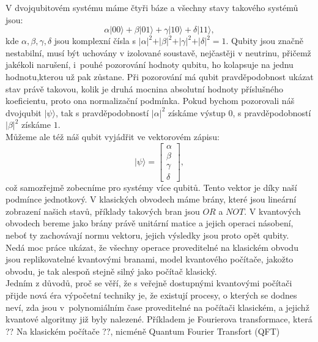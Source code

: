 \documentclass [12pt]{report}
\begin{document}
V dvojqubitovém systému máme čtyři báze a všechny stavy takového systémů jsou:
\begin{equation*}
\alpha \vert 00 \rangle + \beta \vert 01 \rangle + \gamma \vert 10 \rangle + \delta \vert 11 \rangle, 
\end{equation*}
kde $\alpha,\beta,\gamma,\delta$ jsou komplexní čísla s $\vert \alpha \vert ^2 + \vert \beta \vert^2 + \vert \gamma \vert^2 + \vert \delta \vert^2 = 1$. Qubity jsou značně nestabilní, musí být uchovány v izolované soustavě, nejčastěji v neutrinu, přičemž jakékoli narušení, i~pouhé pozorování hodnoty qubitu, ho kolapsuje na jednu hodnotu,kterou už pak zůstane. Při pozorování má qubit pravděpodobnost ukázat stav právě takovou, kolik je druhá mocnina absolutní hodnoty příslušného koeficientu, proto ona normalizační podmínka. Pokud bychom pozorovali náš dvojqubit $\vert \psi \rangle$, tak s pravděpodobností $\vert \alpha \vert ^2$ získáme výstup $0$, s pravděpodobností $\vert \beta \vert ^2$ získáme $1$.\\

Můžeme ale též náš qubit vyjádřit ve vektorovém zápisu:
\begin{equation*}
\vert \psi \rangle = \begin{bmatrix}
\alpha \\
\beta \\
\gamma \\
\delta
\end{bmatrix},
\end{equation*}
což samozřejmě zobecníme pro systémy více qubitů. Tento vektor je díky naší podmínce jednotkový. V klasických obvodech máme brány, které jsou lineární zobrazení našich stavů, příklady takových bran jsou $OR$ a $NOT$. V kvantových obvodech bereme jako brány právě unitární matice a jejich operaci násobení, neboť ty zachovávají normu vektoru, jejich výsledky jsou proto opět qubity.\\

Nedá moc práce ukázat, že všechny operace proveditelné na klasickém obvodu jsou replikovatelné kvantovými branami, model kvantového počítače, jakožto obvodu, je tak alespoň stejně silný jako počítač klasický.\\

Jedním z důvodů, proč se věří, že s veřejně dostupnými kvantovými počítači přijde nová éra výpočetní techniky je, že existují procesy, o kterých se dodnes neví, zda jsou v~polynomiálním čase proveditelné na počítači klasickém, a jejichž kvantové algoritmy již byly nalezené. Příkladem je Fourierova transformace, která ?? Na klasickém počítače ??, nicméně Quantum Fourier Transfort (QFT) 
\end{document}
